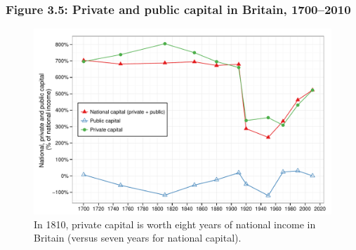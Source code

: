 \documentclass[t]{beamer}\usepackage[]{graphicx}\usepackage[]{color}
\newenvironment{knitrout}{}{} %
\begin{document}
\begin{frame}[label=Figure_3_5]
\frametitle{Figure 3.5: Private and public capital in Britain, 1700--2010}
\begin{figure}[t]
\begin{minipage}[b]{\textwidth}
\centering
\begin{knitrout}\footnotesize
{}\color{fgcolor}

{\centering \includegraphics[width=1\linewidth]{figures/color/Figure_3_5} 

}



\end{knitrout}
\caption{In 1810, private capital is worth eight years of national income in Britain (versus seven years for national capital).}
\end{minipage}
\end{figure}
\end{frame}
\end{document}
